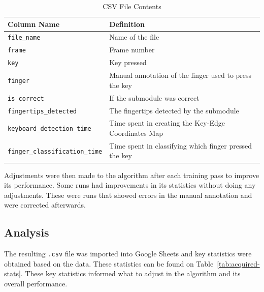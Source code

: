 \documentclass{report}
\begin{document}
\begin{table}[H]
	\centering
	\begin{tabular}{ p{} p{} }
		\hline
		Column Name                           & Definition                                             \\
		\hline
		\texttt{file\_name}                   & Name of the file                                       \\
		\texttt{frame}                        & Frame number                                           \\
		\texttt{key}                          & Key pressed                                            \\
		\texttt{finger}                       & Manual annotation of the finger used to press the key  \\
		\texttt{is\_correct}                  & If the submodule was correct                           \\
		\texttt{fingertips\_detected}         & The fingertips detected by the submodule               \\
		\texttt{keyboard\_detection\_time}    & Time spent in creating the Key-Edge Coordinates Map    \\
		\texttt{finger\_classification\_time} & Time spent in classifying which finger pressed the key \\
	\end{tabular}
	\caption{\label{tab:csv-output}CSV File Contents}
\end{table}

Adjustments were then made to the algorithm after each training pass to improve
its performance. Some runs had improvements in its statistics without doing any
adjustments. These were runs that showed errors in the manual annotation and
were corrected afterwards.

\subsection{Analysis}
The resulting \texttt{.csv} file was imported into Google Sheets and key
statistics were obtained based on the data. These statistics can be found on
Table~\ref{tab:acquired-stats}. These key statistics informed what to adjust in
the algorithm and its overall performance.
\end{document}
